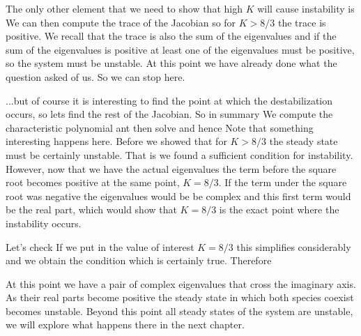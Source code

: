 The only other element that we need to show that high $K$ will cause instability is 
We can then compute the trace of the Jacobian 
so for $K>8/3$ the trace is positive. We recall that the trace is also the sum of the eigenvalues and if the sum of the eigenvalues is positive at least one of the eigenvalues must be positive, so the system must be unstable. At this point we have already done what the question asked of us. So we can stop here.

...but of course it is interesting to find the point at which the destabilization occurs, so lets find the rest of the Jacobian. 
So in summary 
We compute the characteristic polynomial 
ant then solve 
and hence
Note that something interesting happens here. Before we showed that for $K>8/3$ the steady state must be certainly unstable. That is we found a sufficient condition for instability. However, now that we have the actual eigenvalues the term before the square root becomes positive at the same point, $K=8/3$. If the term under the square root was negative the eigenvalues would be be complex and this first term would be the real part, which would show that $K=8/3$ is the exact point where the instability occurs. 

Let's check 
If we put in the value of interest $K=8/3$ this simplifies considerably and we obtain the condition 
which is certainly true. Therefore 

At this point we have a pair of complex eigenvalues that cross the imaginary axis. As their real parts become positive the steady state in which both species coexist becomes unstable. Beyond this point all steady states of the system are unstable, we will explore what happens there in the next chapter.  
